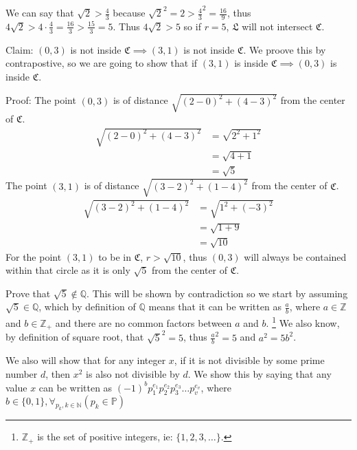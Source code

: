 \documentclass{article}
\begin{document}
We can say that $\sqrt2>\frac43$ because $\sqrt2^2=2>\frac43^2=\frac{16}9$, thus $4\sqrt2>4\cdot\frac43=\frac{16}3>\frac{15}3=5$. Thus $4\sqrt2>5$ so if $r=5$, $\mathfrak L$ will not intersect $\mathfrak C$.
\bigskip

Claim: $(0,3)$ is not inside $\mathfrak C\implies(3,1)$ is not inside $\mathfrak C$. We proove this by contrapostive, so we are going to show that if $(3,1)$ is inside $\mathfrak C\implies(0,3)$ is inside $\mathfrak C$.

Proof: The point $(0,3)$ is of distance $\sqrt{(2-0)^2+(4-3)^2}$ from the center of $\mathfrak C$.
\begin{align*}
\sqrt{(2-0)^2+(4-3)^2} &= \sqrt{2^2+1^2} \\
&= \sqrt{4+1} \\
&= \sqrt5
\end{align*}
The point $(3,1)$ is of distance $\sqrt{(3-2)^2+(1-4)^2}$ from the center of $\mathfrak C$.
\begin{align*}
\sqrt{(3-2)^2+(1-4)^2}&=\sqrt{1^2+(-3)^2} \\
&=\sqrt{1+9} \\
&=\sqrt{10}
\end{align*}
For the point $(3,1)$ to be in $\mathfrak C$, $r>\sqrt{10}$, thus $(0,3)$ will always be contained within that circle as it is only $\sqrt5$ from the center of $\mathfrak C$.
\vspace{2\baselineskip}

Prove that $\sqrt5\not\in\mathbb Q$. This will be shown by contradiction so we start by assuming $\sqrt5\in \mathbb Q$, which by definition of $\mathbb Q$ means that it can be written as $\frac ab$, where $a\in\mathbb Z$ and $b\in\mathbb Z_+$ and there are no common factors between $a$ and $b$. \footnote{$\mathbb Z_+$ is the set of positive integers, ie: $\{1, 2, 3, \ldots\}$.} We also know, by definition of square root, that $\sqrt5^2=5$, thus $\frac ab^2=5$ and $a^2=5b^2$.

We also will show that for any integer $x$, if it is not divisible by some prime number $d$, then $x^2$ is also not divisible by $d$. We show this by saying that any value $x$ can be written as $(-1)^b p_1^{e_1} p_2^{e_2} p_3^{e_3} \ldots p_v^{e_v}$, where $b\in\{0,1\}, \forall_{p_k, k\in\mathbb N}(p_k\in\mathbb P) $

\end{document}
